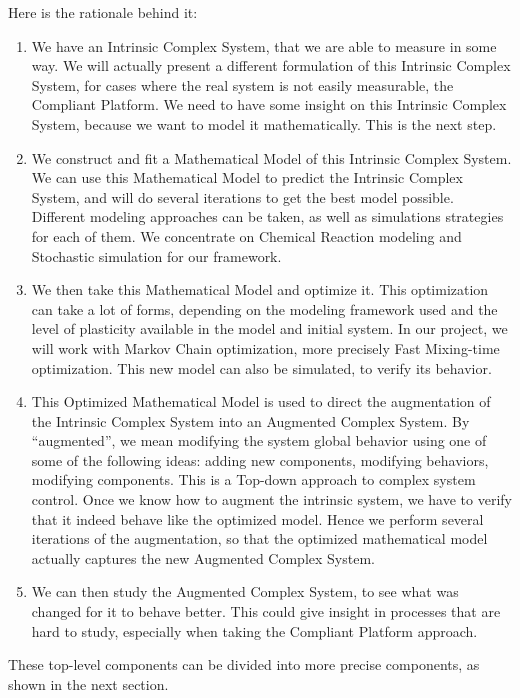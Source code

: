 \documentclass[letterpaper, oneside]{article}
\begin{document}
Here is the rationale behind it:
\begin{enumerate}
	\item We have an Intrinsic Complex System, that we are able to measure in some way. We will actually present a different formulation of this Intrinsic Complex System, for cases where the real system is not easily measurable, the Compliant Platform. We need to have some insight on this Intrinsic Complex System, because we want to model it mathematically. This is the next step.
	\item We construct and fit a Mathematical Model of this Intrinsic Complex System. We can use this Mathematical Model to predict the Intrinsic Complex System, and will do several iterations to get the best model possible. Different modeling approaches can be taken, as well as simulations strategies for each of them. We concentrate on Chemical Reaction modeling and Stochastic simulation for our framework.
	\item We then take this Mathematical Model and optimize it. This optimization can take a lot of forms, depending on the modeling framework used and the level of plasticity available in the model and initial system. In our project, we will work with Markov Chain optimization, more precisely Fast Mixing-time optimization. This new model can also be simulated, to verify its behavior.
	\item This Optimized Mathematical Model is used to direct the augmentation of the Intrinsic Complex System into an Augmented Complex System. By ``augmented'', we mean modifying the system global behavior using one of some of the following ideas: adding new components, modifying behaviors, modifying components. This is a Top-down approach to complex system control. Once we know how to augment the intrinsic system, we have to verify that it indeed behave like the optimized model. Hence we perform several iterations of the augmentation, so that the optimized mathematical model actually captures the new Augmented Complex System.
	\item We can then study the Augmented Complex System, to see what was changed for it to behave better. This could give insight in processes that are hard to study, especially when taking the Compliant Platform approach.
\end{enumerate}

These top-level components can be divided into more precise components, as shown in the next section.
\end{document}
